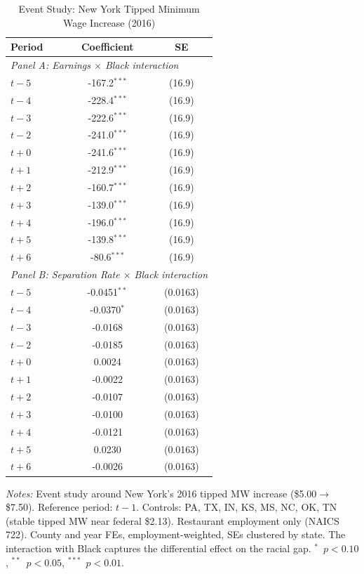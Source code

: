 
\begin{table}[t]
\centering
\caption{Event Study: New York Tipped Minimum Wage Increase (2016)}
\label{tab:eventstudy}
\begin{tabular}{lcc}
\toprule
Period & Coefficient & SE \\
\midrule
\multicolumn{3}{l}{\textit{Panel A: Earnings $\times$ Black interaction}} \\[3pt]
$t-5$ & -167.2$^{***}$ & (16.9) \\
$t-4$ & -228.4$^{***}$ & (16.9) \\
$t-3$ & -222.6$^{***}$ & (16.9) \\
$t-2$ & -241.0$^{***}$ & (16.9) \\
$t+0$ & -241.6$^{***}$ & (16.9) \\
$t+1$ & -212.9$^{***}$ & (16.9) \\
$t+2$ & -160.7$^{***}$ & (16.9) \\
$t+3$ & -139.0$^{***}$ & (16.9) \\
$t+4$ & -196.0$^{***}$ & (16.9) \\
$t+5$ & -139.8$^{***}$ & (16.9) \\
$t+6$ & -80.6$^{***}$ & (16.9) \\[6pt]
\multicolumn{3}{l}{\textit{Panel B: Separation Rate $\times$ Black interaction}} \\[3pt]
$t-5$ & -0.0451$^{**}$ & (0.0163) \\
$t-4$ & -0.0370$^{*}$ & (0.0163) \\
$t-3$ & -0.0168 & (0.0163) \\
$t-2$ & -0.0185 & (0.0163) \\
$t+0$ & 0.0024 & (0.0163) \\
$t+1$ & -0.0022 & (0.0163) \\
$t+2$ & -0.0107 & (0.0163) \\
$t+3$ & -0.0100 & (0.0163) \\
$t+4$ & -0.0121 & (0.0163) \\
$t+5$ & 0.0230 & (0.0163) \\
$t+6$ & -0.0026 & (0.0163) \\
\bottomrule
\end{tabular}
\begin{tablenotes}
\small
\item \textit{Notes:} Event study around New York's 2016 tipped MW increase (\$5.00$\to$\$7.50). Reference period: $t-1$. Controls: PA, TX, IN, KS, MS, NC, OK, TN (stable tipped MW near federal \$2.13). Restaurant employment only (NAICS 722). County and year FEs, employment-weighted, SEs clustered by state. The interaction with Black captures the differential effect on the racial gap. $^{*}$~$p<0.10$, $^{**}$~$p<0.05$, $^{***}$~$p<0.01$.
\end{tablenotes}
\end{table}
